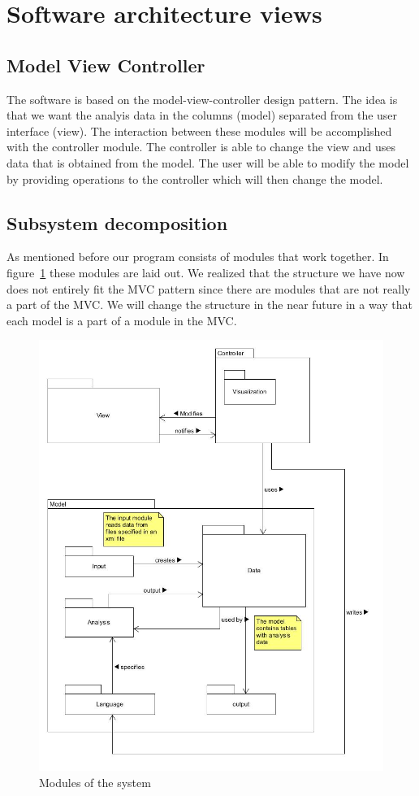 \documentclass[a4paper]{article}
\begin{document}
\section{Software architecture views}

\subsection{Model View Controller}
\label{subsec:mvc}
The software is based on the model-view-controller design pattern. The idea is that we want the analyis data in the columns (model) separated from the user interface (view). The interaction between these modules will be accomplished with the controller module. The controller is able to change the view and uses data that is obtained from the model. The user will be able to modify the model by providing operations to the controller which will then change the model.

\subsection{Subsystem decomposition}

As mentioned before our program consists of modules that work together. In figure~\ref{fig:modules} these modules are laid out. We realized that the structure we have now does not entirely fit the MVC pattern since there are modules that are not really a part of the MVC. We will change the structure in the near future in a way that each model is a part of a module in the MVC.

\begin{figure}[h]
	\centering
    	\includegraphics[scale=0.5]{images/modules.jpg}
    \caption{Modules of the system}
	\label{fig:modules}
\end{figure}
\end{document}
